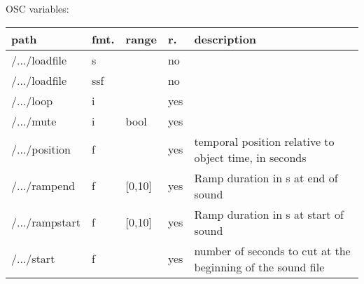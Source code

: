 \begin{snugshade}
{\footnotesize
\label{osctab:tascarapsndfile}
OSC variables:
\nopagebreak

\begin{tabularx}{\textwidth}{llllX}
\hline
path & fmt. & range & r. & description\\
\hline
/.../loadfile & s &  & no & \\
/.../loadfile & ssf &  & no & \\
/.../loop & i &  & yes & \\
/.../mute & i & bool & yes & \\
/.../position & f &  & yes & temporal position relative to object time, in seconds\\
/.../rampend & f & [0,10] & yes & Ramp duration in s at end of sound\\
/.../rampstart & f & [0,10] & yes & Ramp duration in s at start of sound\\
/.../start & f &  & yes & number of seconds to cut at the beginning of the sound file\\
\hline
\end{tabularx}
}
\end{snugshade}
